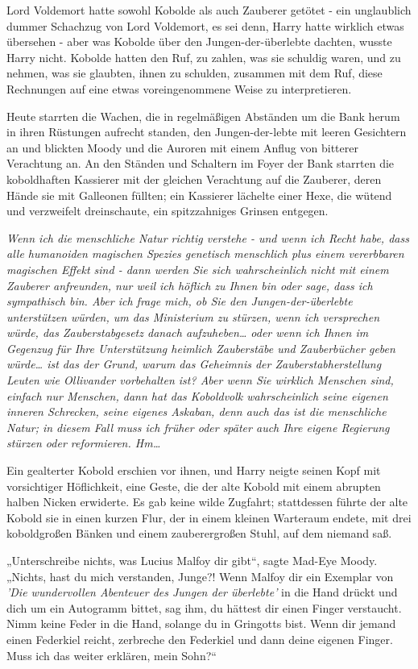 {Lord Voldemort hatte sowohl Kobolde als auch Zauberer getötet - ein unglaublich dummer Schachzug von Lord Voldemort, es sei denn, Harry hatte wirklich etwas übersehen - aber was Kobolde über den Jungen-der-überlebte dachten, wusste Harry nicht. Kobolde hatten den Ruf, zu zahlen, was sie schuldig waren, und zu nehmen, was sie glaubten, ihnen zu schulden, zusammen mit dem Ruf, diese Rechnungen auf eine etwas voreingenommene Weise zu interpretieren.

Heute starrten die Wachen, die in regelmäßigen Abständen um die Bank herum in ihren Rüstungen aufrecht standen, den Jungen-der-lebte mit leeren Gesichtern an und blickten Moody und die Auroren mit einem Anflug von bitterer Verachtung an. An den Ständen und Schaltern im Foyer der Bank starrten die koboldhaften Kassierer mit der gleichen Verachtung auf die Zauberer, deren Hände sie mit Galleonen füllten; ein Kassierer lächelte einer Hexe, die wütend und verzweifelt dreinschaute, ein spitzzahniges Grinsen entgegen.

\emph{Wenn ich die menschliche Natur richtig verstehe - und wenn ich Recht habe, dass alle humanoiden magischen Spezies genetisch menschlich plus einem vererbbaren magischen Effekt sind - dann werden Sie sich wahrscheinlich nicht mit einem Zauberer anfreunden, nur weil ich höflich zu Ihnen bin oder sage, dass ich sympathisch bin. Aber ich frage mich, ob Sie den Jungen-der-überlebte unterstützen würden, um das Ministerium zu stürzen, wenn ich versprechen würde, das Zauberstabgesetz danach aufzuheben… oder wenn ich Ihnen im Gegenzug für Ihre Unterstützung heimlich Zauberstäbe und Zauberbücher geben würde… ist das der Grund, warum das Geheimnis der Zauberstabherstellung Leuten wie Ollivander vorbehalten ist? Aber wenn Sie wirklich Menschen sind, einfach nur Menschen, dann hat das Koboldvolk wahrscheinlich seine eigenen inneren Schrecken, seine eigenes Askaban, denn auch das ist die menschliche Natur; in diesem Fall muss ich früher oder später auch Ihre eigene Regierung stürzen oder reformieren. Hm…}

Ein gealterter Kobold erschien vor ihnen, und Harry neigte seinen Kopf mit vorsichtiger Höflichkeit, eine Geste, die der alte Kobold mit einem abrupten halben Nicken erwiderte. Es gab keine wilde Zugfahrt; stattdessen führte der alte Kobold sie in einen kurzen Flur, der in einem kleinen Warteraum endete, mit drei koboldgroßen Bänken und einem zauberergroßen Stuhl, auf dem niemand saß.

„Unterschreibe nichts, was Lucius Malfoy dir gibt“, sagte Mad-Eye Moody. „Nichts, hast du mich verstanden, Junge?! Wenn Malfoy dir ein Exemplar von \emph{'Die wundervollen Abenteuer des Jungen der überlebte'} in die Hand drückt und dich um ein Autogramm bittet, sag ihm, du hättest dir einen Finger verstaucht. Nimm keine Feder in die Hand, solange du in Gringotts bist. Wenn dir jemand einen Federkiel reicht, zerbreche den Federkiel und dann deine eigenen Finger. Muss ich das weiter erklären, mein Sohn?“

}
